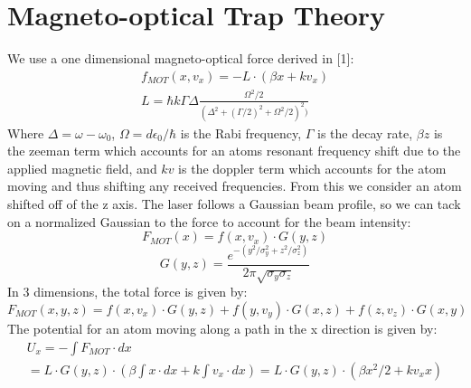 \documentclass[10pt,showpacs,preprintnumbers,footinbib,amsmath,amssymb,aps,prl,groupedaddress,superscriptaddress,showkeys]{revtex4-1}
\begin{document}
\section{Magneto-optical Trap Theory}
We use a one dimensional magneto-optical force derived in [1]:
\begin{equation}
\begin{multlined}
f_{MOT}(x, v_x) = - L \cdot (\beta x + k v_x) \\ 
L = \hbar k \Gamma\Delta\frac{\Omega^{2}/2}{(\Delta^{2}+(\Gamma/2)^{2}+\Omega^{2}/2)^{2})}
\end{multlined}
\end{equation}
Where $\Delta = \omega-\omega_{0}$, $\Omega = d \epsilon_{0} /\hbar$ is the Rabi frequency, $\Gamma$ is the decay rate, $\beta z$ is the zeeman term which accounts for an atoms resonant frequency shift due to the applied magnetic field, and $k v$ is the doppler term which accounts for the atom moving and thus shifting any received frequencies.
From this we consider an atom shifted off of the z axis. The laser follows a Gaussian beam profile, so we can tack on a normalized Gaussian to the force to account for the beam intensity:
\begin{equation}
F_{MOT}(x) = f(x,v_x)\cdot G(y,z)
\end{equation}
\begin{equation}
G(y,z) = \frac{e^{-(y^2/\sigma_{y}^2+z^2/\sigma_z^2)}}{2\pi\sqrt{\sigma_y\sigma_z}}
\end{equation}
In 3 dimensions, the total force is given by:
\begin{equation}
F_{MOT}(x,y,z) = f(x, v_{x})\cdot G(y,z)+f(y,v_{y})\cdot G(x,z)+f(z,v_{z})\cdot G(x,y)
\end{equation}
The potential for an atom moving along a path in the x direction is given by:
\begin{equation}
\begin{multlined}
U_{x} = -\int F_{MOT} \cdot dx \\
= L \cdot G(y,z) \cdot (\beta \int x \cdot dx +k \int v_x \cdot dx) 
= L \cdot G(y,z) \cdot (\beta x^2/2 +k v_x x)
\end{multlined}
\end{equation}
\end{document}
